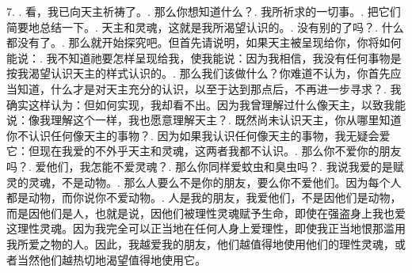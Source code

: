 7. . 看，我已向天主祈祷了。. 那么你想知道什么？. 我所祈求的一切事。. 把它们简要地总结一下。. 天主和灵魂，这就是我所渴望认识的。. 没有别的了吗？. 什么都没有了。. 那么就开始探究吧。但首先请说明，如果天主被呈现给你，你将如何能说：. 我不知道祂要怎样呈现给我，使我能说：因为我相信，我没有任何事物是按我渴望认识天主的样式认识的。. 那么我们该做什么？你难道不认为，你首先应当知道，什么才是对天主充分的认识，以至于达到那点后，不再进一步寻求？. 我确实这样认为：但如何实现，我却看不出。因为我曾理解过什么像天主，以致我能说：像我理解这个一样，我也愿意理解天主？. 既然尚未认识天主，你从哪里知道你不认识任何像天主的事物？. 因为如果我认识任何像天主的事物，我无疑会爱它：但现在我爱的不外乎天主和灵魂，这两者我都不认识。. 那么你不爱你的朋友吗？. 爱他们，我怎能不爱灵魂？. 那么你同样爱蚊虫和臭虫吗？. 我说我爱的是赋灵的灵魂，不是动物。. 那么人要么不是你的朋友，要么你不爱他们。因为每个人都是动物，而你说你不爱动物。. 人是我的朋友，我爱他们，不是因他们是动物，而是因他们是人，也就是说，因他们被理性灵魂赋予生命，即使在强盗身上我也爱这理性灵魂。因为我完全可以正当地在任何人身上爱理性，即使我正当地恨那滥用我所爱之物的人。因此，我越爱我的朋友，他们越值得地使用他们的理性灵魂，或者当然他们越热切地渴望值得地使用它。\par

